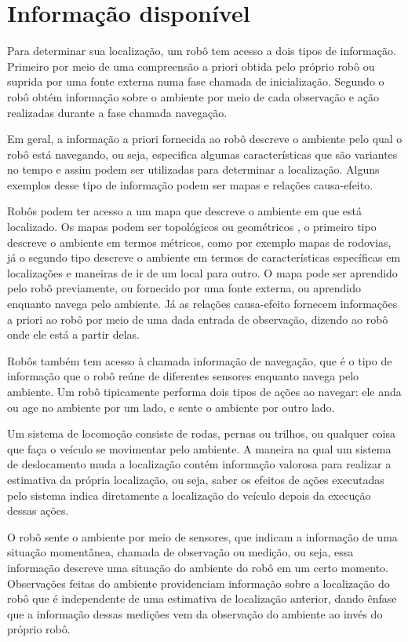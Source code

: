 \documentclass[acronym, symbols, table, deposito]{fei}
\begin{document}
		\section{Informação disponível}
			
			Para determinar sua localização, um robô tem acesso a dois tipos de informação. Primeiro por meio de uma compreensão a priori obtida pelo próprio robô ou suprida por uma fonte externa numa fase chamada de inicialização. Segundo o robô obtém informação sobre o ambiente por meio de cada observação e ação realizadas durante a fase chamada navegação. 
			
			Em geral, a informação a priori fornecida ao robô descreve o ambiente pelo qual o robô está navegando, ou seja, especifica algumas características que são variantes no tempo e assim podem ser utilizadas para determinar a localização. Alguns exemplos desse tipo de informação podem ser mapas e relações causa-efeito.
			
			Robôs podem ter acesso a um mapa que descreve o ambiente em que está localizado. Os mapas podem ser topológicos ou geométricos \cite{mendes2017perceccao}, o primeiro tipo descreve o ambiente em termos métricos, como por exemplo mapas de rodovias, já o segundo tipo descreve o ambiente em termos de características específicas em localizações e maneiras de ir de um local para outro. O mapa pode ser aprendido pelo robô previamente, ou fornecido por uma fonte externa, ou aprendido enquanto navega pelo ambiente. Já as relações causa-efeito fornecem informações a priori ao robô por meio de uma dada entrada de observação, dizendo ao robô onde ele está a partir delas.
			
			Robôs também tem acesso à chamada informação de navegação, que é o tipo de informação que o robô reúne de diferentes sensores enquanto navega pelo ambiente. Um robô tipicamente performa dois tipos de ações ao navegar: ele anda ou age no ambiente por um lado, e sente o ambiente por outro lado.
			
			Um sistema de locomoção consiste de rodas, pernas ou trilhos, ou qualquer coisa que faça o veículo se movimentar pelo ambiente. A maneira na qual um sistema de deslocamento muda a localização contém informação valorosa para realizar a estimativa da própria localização, ou seja, saber os efeitos de ações executadas pelo sistema indica diretamente a localização do veículo depois da execução dessas ações.
			
			O robô sente o ambiente por meio de sensores, que indicam a informação de uma situação momentânea, chamada de observação ou medição, ou seja, essa informação descreve uma situação do ambiente do robô em um certo momento. Observações feitas do ambiente providenciam informação sobre a localização do robô que é independente de uma estimativa de localização anterior, dando ênfase que a informação dessas medições vem da observação do ambiente ao invés do próprio robô.
	
\end{document}
